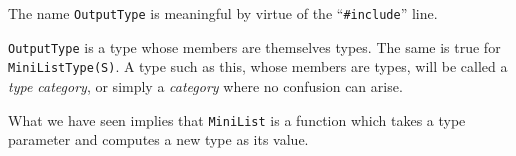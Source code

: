 The name \verb"OutputType" is meaningful by virtue of the
``\verb+#include+'' line.

\verb"OutputType" is a type whose members are themselves types.
The same is true for \verb"MiniListType(S)".
A type such as this, whose members are types, will be called a
{\em type category}, or simply a {\em category} where no confusion
can arise.

What we have seen implies that \verb"MiniList" is a function
which takes a type parameter and computes a new type as its value.

